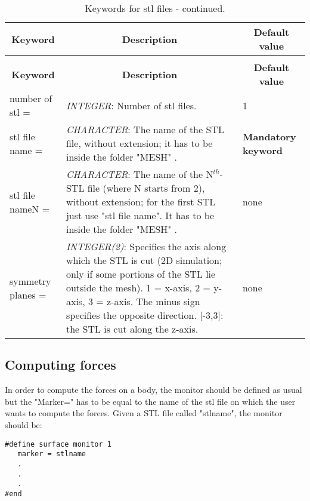 \documentclass[a4paper,10pt]{report}
\begin{document}
\begin{longtable}{|p{4cm}|p{10cm}|p{2.2cm}|}
\caption{Keywords for stl files.} \label{tab:IBMstl} \\
\hline
\multicolumn{1}{|c|}{\textbf{Keyword}} & \multicolumn{1}{c|}{\textbf{Description}} & \multicolumn{1}{c|}{\textbf{Default value}} \\ \hline
\endfirsthead

\caption{Keywords for stl files - continued.} \\
\hline
\multicolumn{1}{|c|}{\textbf{Keyword}} & \multicolumn{1}{c|}{\textbf{Description}} & \multicolumn{1}{c|}{\textbf{Default value}} \\ \hline
\endhead

number of stl = & \textit{INTEGER}: Number of stl files. & 1 \\ \hline

stl file name = & \textit{CHARACTER}: The name of the STL file, without extension; it has to be inside the folder "MESH" . & \textbf{Mandatory keyword} \\ \hline

stl file nameN = & \textit{CHARACTER}: The name of the $\mathrm{N}^{th}$-STL file (where N starts from 2), without extension; for the first STL just use "stl file name". It has to be inside the folder "MESH" . & none \\ \hline

symmetry planes = & \textit{INTEGER(2)}: Specifies the axis along which the STL is cut (2D simulation; only if some portions of the STL lie outside the mesh). 1 = x-axis, 2 = y-axis, 3 = z-axis. The minus sign specifies the opposite direction. [-3,3]: the STL is cut along the z-axis. & none \\ \hline 

\end{longtable}


\subsection{Computing forces}

In order to compute the forces on a body, the monitor should be defined as usual but the "Marker=" has to be equal to the name of the stl file on which the user wants to compute the forces. Given a STL file called "stlname", the monitor should be:
\begin{lstlisting}
#define surface monitor 1
   marker = stlname
   .
   .
   .
#end
\end{lstlisting}
\end{document}

